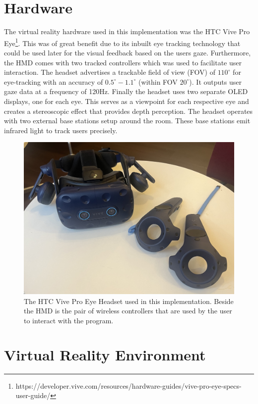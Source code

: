 \documentclass{l4proj}
\begin{document}
\section{Hardware} \label{hardware}
The virtual reality hardware used in this implementation was the HTC Vive Pro Eye\footnote{https://developer.vive.com/resources/hardware-guides/vive-pro-eye-specs-user-guide/}. This was of great benefit due to its inbuilt eye tracking technology that could be used later for the visual feedback based on the users gaze. Furthermore, the HMD comes with two tracked controllers which was used to facilitate user interaction. The headset advertises a trackable field of view (FOV) of $110^\circ$ for eye-tracking with an accuracy of $0.5^\circ - 1.1^\circ$ (within FOV $20^\circ$). It outputs user gaze data at a frequency of 120Hz. Finally the headset uses two separate OLED displays, one for each eye. This serves as a viewpoint for each respective eye and creates a stereoscopic effect that provides depth perception. The headset operates with two external base stations setup around the room. These base stations emit infrared light to track users precisely.
\begin{figure}[htbp]
    \centering
    \includegraphics[width=0.6\linewidth]{dissertation/images/HTC_Headset.jpg}    

    \caption{The HTC Vive Pro Eye Headset used in this implementation. Beside the HMD is the pair of wireless controllers that are used by the user to interact with the program.
    }
    \label{fig:HTC_Headset} 
\end{figure}

\section{Virtual Reality Environment}
\end{document}
